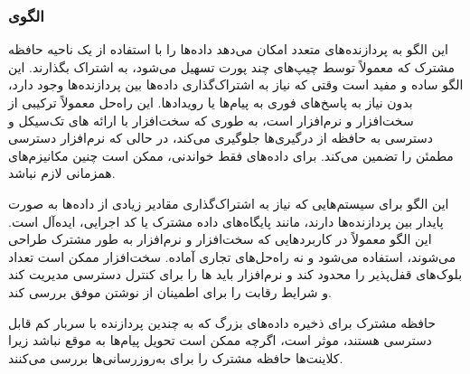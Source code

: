 \subsubsection{الگوی }
\label{distrSharedMemSec}
\begin{RTL}
این الگو \cite{ref4}
به پردازنده‌های متعدد امکان می‌دهد داده‌ها را با استفاده از یک
ناحیه حافظه مشترک که معمولاً توسط چیپ‌های 
چند پورت تسهیل می‌شود، به اشتراک بگذارند. این الگو ساده و مفید است
وقتی که نیاز به اشتراک‌گذاری داده‌ها بین پردازنده‌ها وجود دارد،
بدون نیاز به پاسخ‌های فوری به پیام‌ها یا رویدادها. این راه‌حل معمولاً ترکیبی
از سخت‌افزار و نرم‌افزار است، به طوری که سخت‌افزار با ارائه های
تک‌سیکل  و دسترسی به حافظه از درگیری‌ها جلوگیری می‌کند،
در حالی که نرم‌افزار دسترسی مطمئن را تضمین می‌کند.
برای داده‌های فقط خواندنی، ممکن است چنین مکانیزم‌های همزمانی لازم نباشد.
\end{RTL}
\begin{RTL}
این الگو برای سیستم‌هایی که نیاز به اشتراک‌گذاری مقادیر زیادی از داده‌ها
به صورت پایدار بین پردازنده‌ها دارند، مانند پایگاه‌های داده مشترک یا کد اجرایی،
ایده‌آل است. این الگو معمولاً در کاربردهایی که سخت‌افزار و نرم‌افزار به طور مشترک طراحی
می‌شوند، استفاده می‌شود و نه راه‌حل‌های تجاری آماده.
سخت‌افزار ممکن است تعداد بلوک‌های قفل‌پذیر را محدود کند و نرم‌افزار باید
ها را برای کنترل دسترسی مدیریت کند
و شرایط رقابت را برای اطمینان از نوشتن موفق بررسی کند.
\end{RTL}
\begin{RTL}
حافظه مشترک برای ذخیره داده‌های بزرگ که به چندین پردازنده با سربار
کم قابل دسترسی هستند، موثر است، اگرچه ممکن است تحویل پیام‌ها
به موقع نباشد زیرا کلاینت‌ها حافظه مشترک را برای به‌روزرسانی‌ها بررسی می‌کنند.
\end{RTL}
